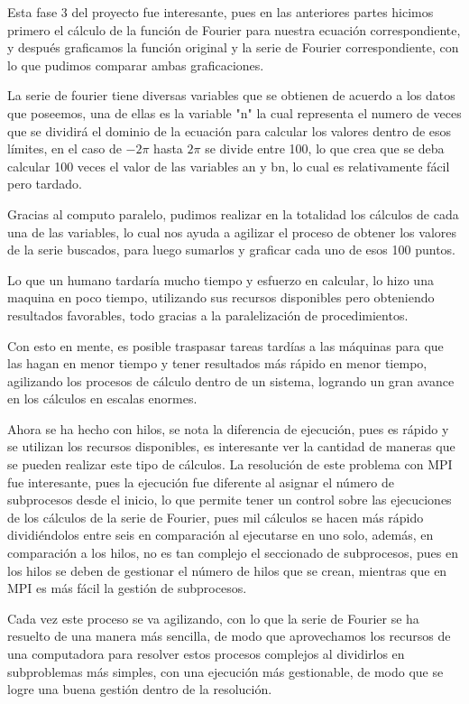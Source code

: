 Esta fase 3 del proyecto fue interesante, pues en las anteriores partes hicimos primero el cálculo de la función de Fourier para nuestra ecuación correspondiente, y después graficamos la función original y la serie de Fourier correspondiente, con lo que pudimos comparar ambas graficaciones.

La serie de fourier tiene diversas variables que se obtienen de acuerdo a los datos que poseemos, una de ellas es la variable "n" la cual representa el numero de veces que se dividirá el dominio de la ecuación para calcular los valores dentro de esos límites, en el caso de \(-2 \pi\) hasta \(2 \pi\) se divide entre 100, lo que crea que se deba calcular 100 veces el valor de las variables an y bn, lo cual es relativamente fácil pero tardado.

Gracias al computo paralelo, pudimos realizar en la totalidad los cálculos de cada una de las variables, lo cual nos ayuda a agilizar el proceso de obtener los valores de la serie buscados, para luego sumarlos y graficar cada uno de esos 100 puntos.

Lo que un humano tardaría mucho tiempo y esfuerzo en calcular, lo hizo una maquina en poco tiempo, utilizando sus recursos disponibles pero obteniendo resultados favorables, todo gracias a la paralelización de procedimientos.

Con esto en mente, es posible traspasar tareas tardías a las máquinas para que las hagan en menor tiempo y tener resultados más rápido en menor tiempo, agilizando los procesos de cálculo dentro de un sistema, logrando un gran avance en los cálculos en escalas enormes.

Ahora se ha hecho con hilos, se nota la diferencia de ejecución, pues es rápido y se utilizan los recursos disponibles, es interesante ver la cantidad de maneras que se pueden realizar este tipo de cálculos.
La resolución de este problema con MPI fue interesante, pues la ejecución fue diferente al asignar el número de subprocesos desde el inicio, lo que permite tener un control sobre las ejecuciones de los cálculos de la serie de Fourier, pues mil cálculos se hacen más rápido dividiéndolos entre seis en comparación al ejecutarse en uno solo, además, en comparación a los hilos, no es tan complejo el seccionado de subprocesos, pues en los hilos se deben de gestionar el número de hilos que se crean, mientras que en MPI es más fácil la gestión de subprocesos. 

Cada vez este proceso se va agilizando, con lo que la serie de Fourier se ha resuelto de una manera más sencilla, de modo que aprovechamos los recursos de una computadora para resolver estos procesos complejos al dividirlos en subproblemas más simples, con una ejecución más gestionable, de modo que se logre una buena gestión dentro de la resolución.
